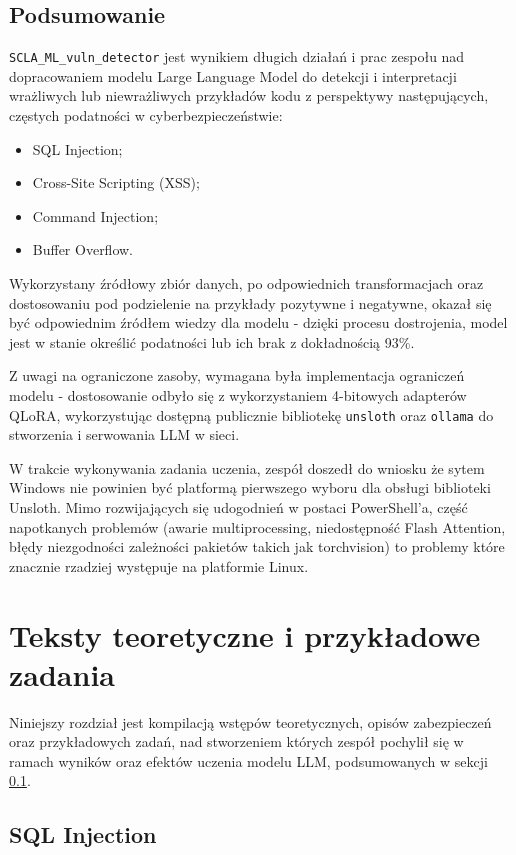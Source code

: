 \documentclass[12pt,a4paper]{article}
\begin{document}
\subsection{Podsumowanie}
\label{ssec:model_summary}
\texttt{SCLA\_ML\_vuln\_detector} jest wynikiem długich działań i prac zespołu nad dopracowaniem modelu Large Language Model do detekcji i interpretacji wrażliwych lub niewrażliwych
przykładów kodu z perspektywy następujących, częstych podatności w cyberbezpieczeństwie:
\begin{itemize} 
    \item SQL Injection;
    \item Cross-Site Scripting (XSS);
    \item Command Injection;
    \item Buffer Overflow.
\end{itemize}

Wykorzystany źródłowy zbiór danych, po odpowiednich transformacjach oraz dostosowaniu pod podzielenie na przykłady pozytywne i negatywne, okazał się być odpowiednim źródłem wiedzy dla modelu -
dzięki procesu dostrojenia, model jest w stanie określić podatności lub ich brak z dokładnością 93\%. 

Z uwagi na ograniczone zasoby, wymagana była implementacja ograniczeń modelu - dostosowanie odbyło się z wykorzystaniem 4-bitowych adapterów QLoRA, wykorzystując dostępną publicznie 
bibliotekę \texttt{unsloth} oraz \texttt{ollama} do stworzenia i serwowania LLM w sieci.

W trakcie wykonywania zadania uczenia, zespół doszedł do wniosku że sytem Windows nie powinien być platformą pierwszego wyboru dla obsługi biblioteki Unsloth. Mimo rozwijających się
udogodnień w postaci PowerShell'a, część napotkanych problemów (awarie multiprocessing, niedostępność Flash Attention, błędy niezgodności zależności pakietów takich jak torchvision)
to problemy które znacznie rzadziej występuje na platformie Linux.

\section{Teksty teoretyczne i przykładowe zadania}

Niniejszy rozdział jest kompilacją wstępów teoretycznych, opisów zabezpieczeń oraz przykładowych zadań, nad stworzeniem których zespół pochylił się w ramach wyników oraz efektów uczenia modelu LLM, podsumowanych w sekcji \ref{ssec:model_summary}. 


\subsection{SQL Injection}
\end{document}
